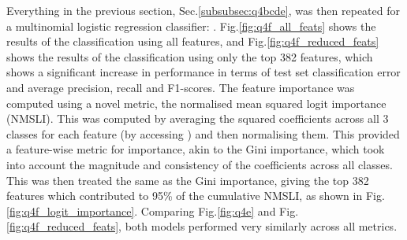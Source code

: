     Everything in the previous section, Sec.\eqref{subsubsec:q4bcde}, was then repeated for a multinomial logistic
    regression classifier: .
    Fig.\eqref{fig:q4f_all_feats} shows the results of the classification using all features, and
    Fig.\eqref{fig:q4f_reduced_feats} shows the results of the classification using only the top 382 features, which
    shows a significant increase in performance in terms of test set classification error and average precision, recall
    and F1-scores.
    The feature importance was computed using a novel metric, the normalised mean squared logit importance (NMSLI).
    This was computed by averaging the squared coefficients across all 3 classes for each feature (by accessing
    ) and then normalising them.
    This provided a feature-wise metric for importance, akin to the Gini importance, which took into account the
    magnitude and consistency of the coefficients across all classes.
    This was then treated the same as the Gini importance, giving the top 382 features which contributed to 95\% of the
    cumulative NMSLI, as shown in Fig.\eqref{fig:q4f_logit_importance}.
    Comparing Fig.\eqref{fig:q4e} and Fig.\eqref{fig:q4f_reduced_feats}, both models performed very similarly across
    all metrics.
